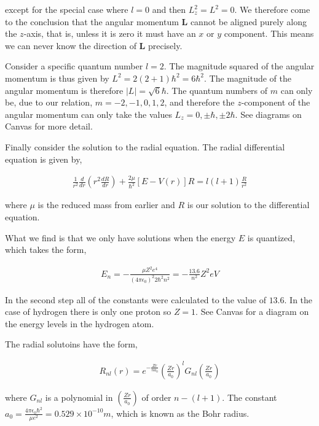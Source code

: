 \documentclass[11pt]{amsart}
\begin{document}
except for the special case where $l = 0$ and then $L_z^2 = L^2 = 0$. We therefore come to the conclusion that the angular momentum $\mathbf{L}$ cannot be aligned purely along the $z$-axis, that is, unless it is zero it must have an $x$ or $y$ component. This means we can never know the direction of $\mathbf{L}$ precisely.

Consider a specific quantum number $l = 2$. The magnitude squared of the angular momentum is thus given by $L^2 = 2(2+1)\hbar^2 = 6\hbar^2$. The magnitude of the angular momentum is therefore $|L| = \sqrt{6}\hbar$. The quantum numbers of $m$ can only be, due to our relation, $m = -2, -1, 0, 1, 2$, and therefore the $z$-component of the angular momentum can only take the values $L_z = 0, \pm\hbar, \pm 2\hbar$. See diagrams on Canvas for more detail.

Finally consider the solution to the radial equation. The radial differential equation is given by,

\begin{align*}
  \frac{1}{r^2}\frac{d}{dr}\left(r^2\frac{dR}{dr}\right)+\frac{2\mu}{\hbar^2}\left[E-V(r)\right]R=l(l+1)\frac{R}{r^2}
\end{align*}

where $\mu$ is the reduced mass from earlier and $R$ is our solution to the differential equation.

What we find is that we only have solutions when the energy $E$ is quantized, which takes the form,

\begin{align*}
  E_n = -\frac{\mu Z^2e^4}{{(4\pi\epsilon_0)}^2 2\hbar^2 n^2} = -\frac{13.6}{n^2} Z^2 eV
\end{align*}

In the second step all of the constants were calculated to the value of $13.6$. In the case of hydrogen there is only one proton so $Z = 1$. See Canvas for a diagram on the energy levels in the hydrogen atom.

The radial solutoins have the form,

\begin{align*}
  R_{nl}(r)=e^{-\frac{Zr}{na_0}}{\left(\frac{Zr}{a_0}\right)}^l G_{nl}\left(\frac{Zr}{a_0}\right)
\end{align*}

where $G_{nl}$ is a polynomial in $\left(\frac{Zr}{a_0}\right)$ of order $n - (l + 1)$. The constant $a_0 = \frac{4\pi\epsilon_0\hbar^2}{\mu e^2} = 0.529\times10^{-10} m$, which is known as the Bohr radius.
\end{document}
